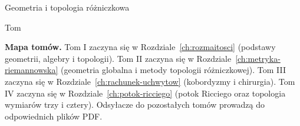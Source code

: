 \begin{titlepage}
\centering
\vspace*{0.22\textheight}
{\Huge Geometria i topologia różniczkowa\par}
\vspace{2cm}
{\LARGE Tom \NumerTomu\par}
\vspace{0.6cm}
{\Large \TytulTomu\par}
\vfill
\begin{minipage}{0.82\textwidth}
\small
\noindent\textbf{Mapa tomów.}
Tom I zaczyna się w Rozdziale~\ref{ch:rozmaitosci}
(podstawy geometrii, algebry i topologii).
Tom II zaczyna się w Rozdziale~\ref{ch:metryka-riemannowska}
(geometria globalna i metody topologii różniczkowej).
Tom III zaczyna się w Rozdziale~\ref{ch:rachunek-uchwytow}
(kobordyzmy i chirurgia).
Tom IV zaczyna się w Rozdziale~\ref{ch:potok-ricciego}
(potok Ricciego oraz topologia wymiarów trzy i cztery).
Odsyłacze do pozostałych tomów prowadzą do odpowiednich plików PDF.
\end{minipage}
\vspace*{0.08\textheight}
\end{titlepage}

\begingroup
\footnotesize\linespread{0.90}\selectfont
\setlength{\parskip}{0pt}\tableofcontents
\endgroup
\clearpage

